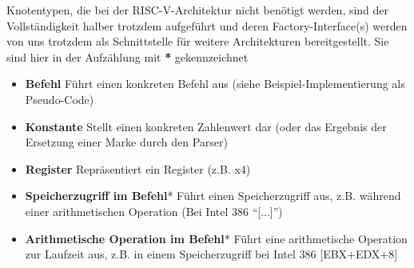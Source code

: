 Knotentypen, die bei der RISC-V-Architektur nicht benötigt werden, sind der Vollständigkeit halber trotzdem aufgeführt und deren Factory-Interface(s) werden von uns trotzdem als Schnittstelle für weitere Architekturen bereitgestellt. Sie sind hier in der Aufzählung mit \textbf{*} gekennzeichnet
\begin{itemize}
	\item \textbf{Befehl} Führt einen konkreten Befehl aus (siehe Beispiel-Implementierung als Pseudo-Code)

	\item \textbf{Konstante} Stellt einen konkreten Zahlenwert dar (oder das Ergebnis der Ersetzung einer Marke durch den Parser)

	\item \textbf{Register} Repräsentiert ein Register (z.B. x4)

	\item \textbf{Speicherzugriff im Befehl}* Führt einen Speicherzugriff aus, z.B. während einer arithmetischen Operation (Bei Intel 386 ``[...]'')

	\item \textbf{Arithmetische Operation im Befehl}* Führt eine arithmetische Operation zur Laufzeit aus, z.B. in einem Speicherzugriff bei Intel 386 [EBX+EDX+8]

\end{itemize}
